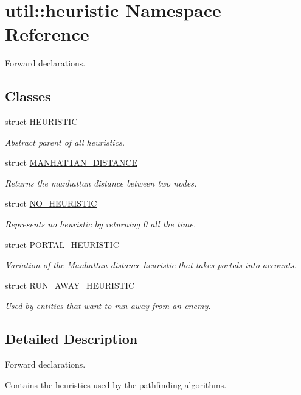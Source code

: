 \hypertarget{namespaceutil_1_1heuristic}{}\section{util\+:\+:heuristic Namespace Reference}
\label{namespaceutil_1_1heuristic}


Forward declarations.  


\subsection*{Classes}
\begin{DoxyCompactItemize}
\item 
struct \hyperlink{structutil_1_1heuristic_1_1_h_e_u_r_i_s_t_i_c}{H\+E\+U\+R\+I\+S\+T\+IC}
\begin{DoxyCompactList}\small\item\em Abstract parent of all heuristics. \end{DoxyCompactList}\item 
struct \hyperlink{structutil_1_1heuristic_1_1_m_a_n_h_a_t_t_a_n___d_i_s_t_a_n_c_e}{M\+A\+N\+H\+A\+T\+T\+A\+N\+\_\+\+D\+I\+S\+T\+A\+N\+CE}
\begin{DoxyCompactList}\small\item\em Returns the manhattan distance between two nodes. \end{DoxyCompactList}\item 
struct \hyperlink{structutil_1_1heuristic_1_1_n_o___h_e_u_r_i_s_t_i_c}{N\+O\+\_\+\+H\+E\+U\+R\+I\+S\+T\+IC}
\begin{DoxyCompactList}\small\item\em Represents no heuristic by returning 0 all the time. \end{DoxyCompactList}\item 
struct \hyperlink{structutil_1_1heuristic_1_1_p_o_r_t_a_l___h_e_u_r_i_s_t_i_c}{P\+O\+R\+T\+A\+L\+\_\+\+H\+E\+U\+R\+I\+S\+T\+IC}
\begin{DoxyCompactList}\small\item\em Variation of the Manhattan distance heuristic that takes portals into accounts. \end{DoxyCompactList}\item 
struct \hyperlink{structutil_1_1heuristic_1_1_r_u_n___a_w_a_y___h_e_u_r_i_s_t_i_c}{R\+U\+N\+\_\+\+A\+W\+A\+Y\+\_\+\+H\+E\+U\+R\+I\+S\+T\+IC}
\begin{DoxyCompactList}\small\item\em Used by entities that want to run away from an enemy. \end{DoxyCompactList}\end{DoxyCompactItemize}


\subsection{Detailed Description}
Forward declarations. 

Contains the heuristics used by the pathfinding algorithms. 